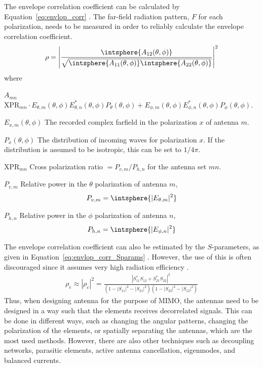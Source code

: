 The envelope correlation coefficient can be calculated by Equation~\ref{eq:envlop_corr} \cite{Wang2010}. The far-field radiation pattern, $F$ for each polarization, needs to be measured in order to reliably calculate the envelope correlation coefficient.
\begin{align} %
\label{eq:envlop_corr}
\rho = 
\left|  
%
\frac
{\intsphere{A_{12}(\theta,\phi)}}
{\sqrt{\intsphere{A_{11}(\theta,\phi)} \intsphere{A_{22}(\theta,\phi)}}}
%
\right|^2
\end{align}
where
\def\xpr{\text{XPR}}
\begin{where}
\item[$A_{mn}$]
    $
    \xpr_{mn} \cdot E_{\theta,m}(\theta,\phi) E^*_{\theta,n}(\theta,\phi) P_{\theta}(\theta,\phi)
    +
    E_{\phi,m}(\theta,\phi)E^*_{\phi,n}(\theta,\phi)P_{\phi}(\theta,\phi)
    $.
\item[$E_{x,m}(\theta,\phi)$] The recorded complex farfield in the polarization $x$ of antenna $m$.
\item[$P_x(\theta,\phi)$] The distribution of incoming waves for polarization $x$. If the distribution is assumed to be isotropic, this can be set to $1/4\pi$.
\item[$\xpr_{mn}$] Cross polarization ratio $= P_{v,m}/P_{h,n}$ for the antenna set $mn$.
\item[$P_{v,m}$] Relative power in the $\theta$ polarization of antenna $m$, 
    \begin{equation*}
        P_{v,m} = \intsphere{|E_{\theta,m}|^2}
    \end{equation*}
\item[$P_{h,n}$] Relative power in the $\phi$ polarization of antenna $n$,
    \begin{equation*}
        P_{h,n} = \intsphere{|E_{\phi,n}|^2}
    \end{equation*}
\end{where}

The envelope correlation coefficient can also be estimated by the $S$-parameters, as given in Equation~\ref{eq:envlop_corr_Sparams} \cite{Alain2010MIMO}. However, the use of this is often discouraged since it assumes very high radiation efficiency \cite{Alain2010MIMO}.
\begin{align} %
\label{eq:envlop_corr_Sparams}
  \rho_e \approx |\rho_c|^2 = \frac{|S^*_{11}S_{12}+S^*_{21}S_{22}|^2}{(1-|S_{11}|^2-|S_{21}|^2)(1-|S_{22}|^2-|S_{12}|^2)}
\end{align}
Thus, when designing antenna for the purpose of MIMO, the antennas need to be designed in a way such that the elements receives decorrelated signals. This can be done in different ways, such as changing the angular patterns, changing the polarization of the elements, or spatially separating the antennas, which are the most used methods. However, there are also other techniques such as decoupling networks, parasitic elements, active antenna cancellation, eigenmodes, and balanced currents. 


